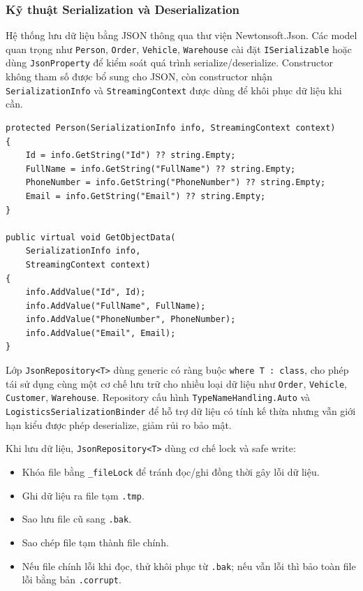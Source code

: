 \documentclass[12pt,a4paper]{article}
\begin{document}
\subsubsection{Kỹ thuật Serialization và Deserialization}

Hệ thống lưu dữ liệu bằng JSON thông qua thư viện Newtonsoft.Json. Các model quan trọng như \texttt{Person}, \texttt{Order}, \texttt{Vehicle}, \texttt{Warehouse} cài đặt \texttt{ISerializable} hoặc dùng \texttt{JsonProperty} để kiểm soát quá trình serialize/deserialize. Constructor không tham số được bổ sung cho JSON, còn constructor nhận \texttt{SerializationInfo} và \texttt{StreamingContext} được dùng để khôi phục dữ liệu khi cần.

\begin{listing}[H]
\caption{Ví dụ ISerializable trong Person}
\begin{verbatim}
protected Person(SerializationInfo info, StreamingContext context)
{
    Id = info.GetString("Id") ?? string.Empty;
    FullName = info.GetString("FullName") ?? string.Empty;
    PhoneNumber = info.GetString("PhoneNumber") ?? string.Empty;
    Email = info.GetString("Email") ?? string.Empty;
}

public virtual void GetObjectData(
    SerializationInfo info,
    StreamingContext context)
{
    info.AddValue("Id", Id);
    info.AddValue("FullName", FullName);
    info.AddValue("PhoneNumber", PhoneNumber);
    info.AddValue("Email", Email);
}
\end{verbatim}
\end{listing}

Lớp \texttt{JsonRepository<T>} dùng generic có ràng buộc \texttt{where T : class}, cho phép tái sử dụng cùng một cơ chế lưu trữ cho nhiều loại dữ liệu như \texttt{Order}, \texttt{Vehicle}, \texttt{Customer}, \texttt{Warehouse}. Repository cấu hình \texttt{TypeNameHandling.Auto} và \texttt{LogisticsSerializationBinder} để hỗ trợ dữ liệu có tính kế thừa nhưng vẫn giới hạn kiểu được phép deserialize, giảm rủi ro bảo mật.

Khi lưu dữ liệu, \texttt{JsonRepository<T>} dùng cơ chế lock và safe write:

\begin{itemize}[leftmargin=1.2cm]
    \item Khóa file bằng \texttt{\_fileLock} để tránh đọc/ghi đồng thời gây lỗi dữ liệu.
    \item Ghi dữ liệu ra file tạm \texttt{.tmp}.
    \item Sao lưu file cũ sang \texttt{.bak}.
    \item Sao chép file tạm thành file chính.
    \item Nếu file chính lỗi khi đọc, thử khôi phục từ \texttt{.bak}; nếu vẫn lỗi thì bảo toàn file lỗi bằng bản \texttt{.corrupt}.
\end{itemize}
\end{document}

